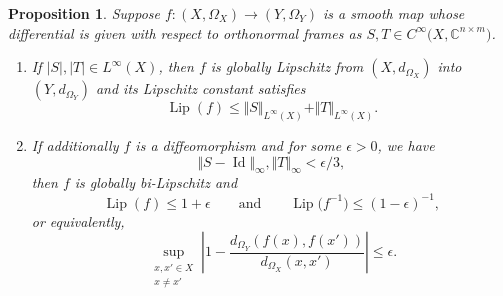 \documentclass[pdftex]{sigma}
\numberwithin{equation}{section}
\newtheorem{Proposition}[Theorem]{Proposition}
\theoremstyle{definition}
\newcommand{\C}{\mathbb{C}} %
\newcommand{\1}{{\bf 1}}
\newcommand{\Id}{\operatorname{Id}}
\DeclareMathOperator{\Lip}{Lip}
\begin{document}
\begin{Proposition}\label{distancebound} Suppose $f\colon (X,\Omega_X)\rightarrow (Y,\Omega_Y)$ is a smooth map whose differential is given with respect to orthonormal frames as $S,T\in C^\infty\bigl(X,\C^{n\times m}\bigr)$.
\begin{enumerate}[label={\rm (\roman*)}]\itemsep=0pt
\item \label{lipschitz1} If $\vert S\vert,\vert T \vert \in L^\infty(X)$, then $f$ is globally Lipschitz from $(X,d_{\Omega_X})$ into $(Y,d_{\Omega_Y})$ and its Lipschitz constant satisfies
\begin{equation*}
\Lip(f) \le \Vert S \Vert_{L^\infty(X)}+ \Vert T \Vert_{L^\infty(X)}.
\end{equation*}
\item\label{lipschitz2} If additionally $f$ is a diffeomorphism and for some $\epsilon>0$, we have
\[
	\Vert S-\Id \Vert_\infty, \Vert T \Vert_\infty <\epsilon/3,
\]
 then $f$ is globally bi-Lipschitz and
 \begin{equation}\label{lipschitz3}
 \Lip (f) \le 1+ \epsilon \qquad \text{and} \qquad \Lip\bigl(f^{-1}\bigr) \le (1-\epsilon)^{-1},
 \end{equation}
 or equivalently,
 \begin{equation}
 \label{lipschitz4}
\sup_{\substack{x,x'\in X\\x\neq x'}}\left \vert 1 - \frac{d_{\Omega_Y}(f(x),f(x'))}{d_{\Omega_X}(x,x')} \right\vert \le \epsilon.
\end{equation}
\end{enumerate}
\end{Proposition}
\end{document}
